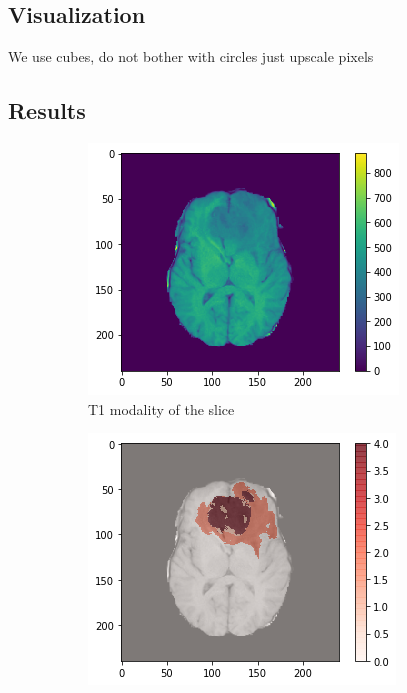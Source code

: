 \subsection{Visualization}
We use cubes, do not bother with circles just upscale pixels

\subsection{Results}

\begin{figure}[H]
    \centering
    \begin{subfigure}{.33\textwidth}
        \centering
        \includegraphics[width=\linewidth]{chapters/07_brats3d/images/01_t1.png}
        \caption{T1 modality of the slice}
    \end{subfigure}%
    \begin{subfigure}{.33\textwidth}
        \centering
        \includegraphics[width=\linewidth]{chapters/07_brats3d/images/05_t1_segment.png}

\end{subfigure}
\end{figure}
